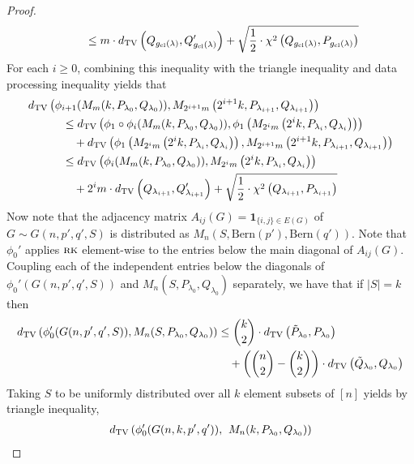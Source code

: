 \begin{proof}
\begin{align*}
&\quad \quad \quad \le m \cdot d_{\text{TV}}\left( Q_{g_{\text{cl}}(\lambda)}, Q'_{g_{\text{cl}}(\lambda)} \right) + \sqrt{\frac{1}{2} \cdot \chi^2\left( Q_{g_{\text{cl}}(\lambda)}, P_{g_{\text{cl}}(\lambda)}\right)}
\end{align*}
For each $i \ge 0$, combining this inequality with the triangle inequality and data processing inequality yields that
\begin{align*}
&d_{\text{TV}}\left( \phi_{i+1}(M_m(k, P_{\lambda_0}, Q_{\lambda_0})), M_{2^{i+1} m}\left(2^{i+1} k, P_{\lambda_{i+1}}, Q_{\lambda_{i+1}}\right) \right) \\
&\quad \quad \quad \le d_{\text{TV}}\left( \phi_1 \circ \phi_{i}(M_m(k, P_{\lambda_0}, Q_{\lambda_0})), \phi_1\left( M_{2^{i} m}\left(2^{i} k, P_{\lambda_{i}}, Q_{\lambda_{i}}\right) \right) \right) \\
&\quad \quad \quad \quad + d_{\text{TV}}\left( \phi_1\left( M_{2^{i} m}\left(2^{i} k, P_{\lambda_{i}}, Q_{\lambda_{i}}\right) \right), M_{2^{i+1} m}\left(2^{i+1} k, P_{\lambda_{i+1}}, Q_{\lambda_{i+1}}\right) \right) \\
&\quad \quad \quad \le d_{\text{TV}}\left( \phi_{i}(M_m(k, P_{\lambda_0}, Q_{\lambda_0})), M_{2^{i} m}\left(2^{i} k, P_{\lambda_{i}}, Q_{\lambda_{i}}\right) \right) \\
&\quad \quad \quad \quad + 2^i m \cdot d_{\text{TV}}\left( Q_{\lambda_{i+1}}, Q'_{\lambda_{i+1}} \right) + \sqrt{\frac{1}{2} \cdot \chi^2\left( Q_{\lambda_{i+1}}, P_{\lambda_{i+1}}\right)}
\end{align*}
Now note that the adjacency matrix $A_{ij}(G) = \mathbf{1}_{\{i, j \} \in E(G)}$ of $G \sim G(n, p', q', S)$ is distributed as $M_n(S, \text{Bern}(p'), \text{Bern}(q'))$. Note that $\phi_0'$ applies $\textsc{rk}$ element-wise to the entries below the main diagonal of $A_{ij}(G)$. Coupling each of the independent entries below the diagonals of $\phi_0'(G(n, p', q', S))$ and $M_n(S, P_{\lambda_0}, Q_{\lambda_0})$ separately, we have that if $|S| = k$ then
\begin{align*}
d_{\text{TV}}\left( \phi_0'(G(n, p', q', S)), M_n(S, P_{\lambda_0}, Q_{\lambda_0}) \right) &\le \binom{k}{2} \cdot d_{\text{TV}}\left( \tilde{P}_{\lambda_0}, P_{\lambda_0} \right) \\
&\quad+\left( \binom{n}{2} - \binom{k}{2} \right) \cdot d_{\text{TV}}\left( \tilde{Q}_{\lambda_0}, Q_{\lambda_0} \right)
\end{align*}
Taking $S$ to be uniformly distributed over all $k$ element subsets of $[n]$ yields by triangle inequality,
\begin{align*}
\TV\left( \phi_0'(G(n, k, p', q')), \right. &\left. M_n(k, P_{\lambda_0}, Q_{\lambda_0}) \right) \\

\end{align*}
\end{proof}
